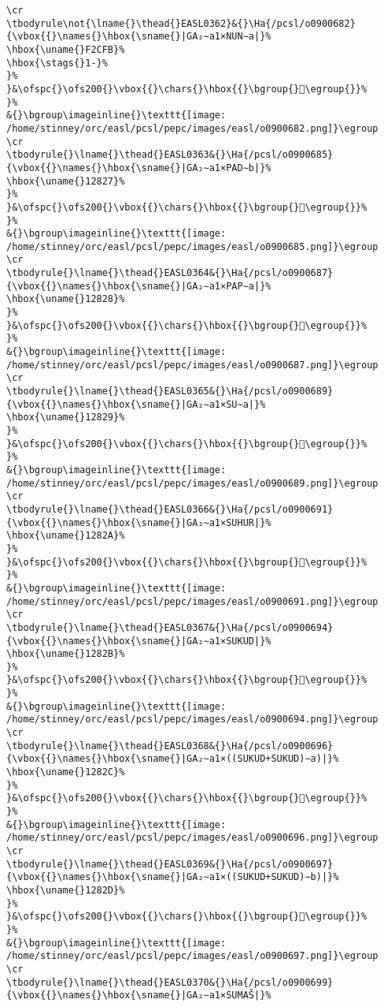 \begin{verbatim}
\cr
\tbodyrule\not{\lname{}\thead{}EASL0362}&{}\Ha{/pcsl/o0900682}{\vbox{{}\names{}\hbox{\sname{}|GA₂∼a1×NUN∼a|}%
\hbox{\uname{}F2CFB}%
\hbox{\stags{}1-}%
}%
}&\ofspc{}\ofs200{}\vbox{{}\chars{}\hbox{{}\bgroup{}󲳻\egroup{}}%
}%
&{}\bgroup\imageinline{}\texttt{[image: /home/stinney/orc/easl/pcsl/pepc/images/easl/o0900682.png]}\egroup
\cr
\tbodyrule{}\lname{}\thead{}EASL0363&{}\Ha{/pcsl/o0900685}{\vbox{{}\names{}\hbox{\sname{}|GA₂∼a1×PAD∼b|}%
\hbox{\uname{}12827}%
}%
}&\ofspc{}\ofs200{}\vbox{{}\chars{}\hbox{{}\bgroup{}𒠧\egroup{}}%
}%
&{}\bgroup\imageinline{}\texttt{[image: /home/stinney/orc/easl/pcsl/pepc/images/easl/o0900685.png]}\egroup
\cr
\tbodyrule{}\lname{}\thead{}EASL0364&{}\Ha{/pcsl/o0900687}{\vbox{{}\names{}\hbox{\sname{}|GA₂∼a1×PAP∼a|}%
\hbox{\uname{}12828}%
}%
}&\ofspc{}\ofs200{}\vbox{{}\chars{}\hbox{{}\bgroup{}𒠨\egroup{}}%
}%
&{}\bgroup\imageinline{}\texttt{[image: /home/stinney/orc/easl/pcsl/pepc/images/easl/o0900687.png]}\egroup
\cr
\tbodyrule{}\lname{}\thead{}EASL0365&{}\Ha{/pcsl/o0900689}{\vbox{{}\names{}\hbox{\sname{}|GA₂∼a1×SU∼a|}%
\hbox{\uname{}12829}%
}%
}&\ofspc{}\ofs200{}\vbox{{}\chars{}\hbox{{}\bgroup{}𒠩\egroup{}}%
}%
&{}\bgroup\imageinline{}\texttt{[image: /home/stinney/orc/easl/pcsl/pepc/images/easl/o0900689.png]}\egroup
\cr
\tbodyrule{}\lname{}\thead{}EASL0366&{}\Ha{/pcsl/o0900691}{\vbox{{}\names{}\hbox{\sname{}|GA₂∼a1×SUHUR|}%
\hbox{\uname{}1282A}%
}%
}&\ofspc{}\ofs200{}\vbox{{}\chars{}\hbox{{}\bgroup{}𒠪\egroup{}}%
}%
&{}\bgroup\imageinline{}\texttt{[image: /home/stinney/orc/easl/pcsl/pepc/images/easl/o0900691.png]}\egroup
\cr
\tbodyrule{}\lname{}\thead{}EASL0367&{}\Ha{/pcsl/o0900694}{\vbox{{}\names{}\hbox{\sname{}|GA₂∼a1×SUKUD|}%
\hbox{\uname{}1282B}%
}%
}&\ofspc{}\ofs200{}\vbox{{}\chars{}\hbox{{}\bgroup{}𒠫\egroup{}}%
}%
&{}\bgroup\imageinline{}\texttt{[image: /home/stinney/orc/easl/pcsl/pepc/images/easl/o0900694.png]}\egroup
\cr
\tbodyrule{}\lname{}\thead{}EASL0368&{}\Ha{/pcsl/o0900696}{\vbox{{}\names{}\hbox{\sname{}|GA₂∼a1×((SUKUD+SUKUD)∼a)|}%
\hbox{\uname{}1282C}%
}%
}&\ofspc{}\ofs200{}\vbox{{}\chars{}\hbox{{}\bgroup{}𒠬\egroup{}}%
}%
&{}\bgroup\imageinline{}\texttt{[image: /home/stinney/orc/easl/pcsl/pepc/images/easl/o0900696.png]}\egroup
\cr
\tbodyrule{}\lname{}\thead{}EASL0369&{}\Ha{/pcsl/o0900697}{\vbox{{}\names{}\hbox{\sname{}|GA₂∼a1×((SUKUD+SUKUD)∼b)|}%
\hbox{\uname{}1282D}%
}%
}&\ofspc{}\ofs200{}\vbox{{}\chars{}\hbox{{}\bgroup{}𒠭\egroup{}}%
}%
&{}\bgroup\imageinline{}\texttt{[image: /home/stinney/orc/easl/pcsl/pepc/images/easl/o0900697.png]}\egroup
\cr
\tbodyrule{}\lname{}\thead{}EASL0370&{}\Ha{/pcsl/o0900699}{\vbox{{}\names{}\hbox{\sname{}|GA₂∼a1×SUMAŠ|}%

\end{verbatim}
